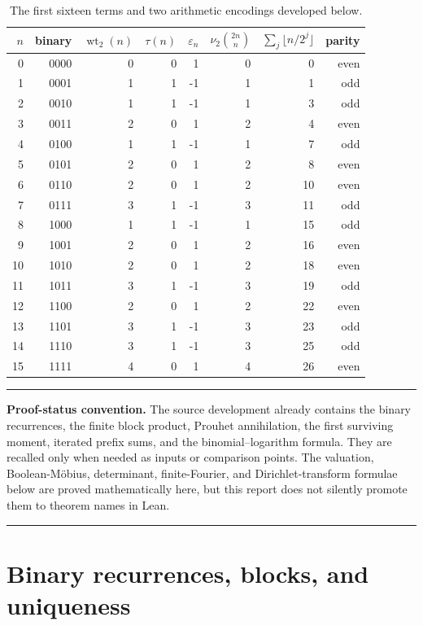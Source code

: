\documentclass[11pt,oneside]{article}
\theoremstyle{definition}
\theoremstyle{remark}
\newcommand{\wt}{\operatorname{wt}_2}
\newcommand{\vtwo}{\nu_2}
\newenvironment{boxedremark}{%
  \par\smallskip\noindent\begin{center}\begin{minipage}{0.94\textwidth}%
  \color{black}\hrule\vspace{0.6em}\small
}{%
  \vspace{0.6em}\hrule\end{minipage}\end{center}\smallskip
}
\begin{document}
\begin{table}[ht]
\centering
\small
\begin{tabular}{@{}rrrrrrrr@{}}
\toprule
$n$ & binary & $\wt(n)$ & $\tau(n)$ & $\varepsilon_n$ &
$\vtwo\binom{2n}{n}$ & $\sum_j\lfloor n/2^j\rfloor$ & parity\\
\midrule
0  & 0000 & 0 & 0 &  1 & 0 &  0 & even\\
1  & 0001 & 1 & 1 & -1 & 1 &  1 & odd\\
2  & 0010 & 1 & 1 & -1 & 1 &  3 & odd\\
3  & 0011 & 2 & 0 &  1 & 2 &  4 & even\\
4  & 0100 & 1 & 1 & -1 & 1 &  7 & odd\\
5  & 0101 & 2 & 0 &  1 & 2 &  8 & even\\
6  & 0110 & 2 & 0 &  1 & 2 & 10 & even\\
7  & 0111 & 3 & 1 & -1 & 3 & 11 & odd\\
8  & 1000 & 1 & 1 & -1 & 1 & 15 & odd\\
9  & 1001 & 2 & 0 &  1 & 2 & 16 & even\\
10 & 1010 & 2 & 0 &  1 & 2 & 18 & even\\
11 & 1011 & 3 & 1 & -1 & 3 & 19 & odd\\
12 & 1100 & 2 & 0 &  1 & 2 & 22 & even\\
13 & 1101 & 3 & 1 & -1 & 3 & 23 & odd\\
14 & 1110 & 3 & 1 & -1 & 3 & 25 & odd\\
15 & 1111 & 4 & 0 &  1 & 4 & 26 & even\\
\bottomrule
\end{tabular}
\caption{The first sixteen terms and two arithmetic encodings developed below.}
\label{tab:first-values}
\end{table}

\begin{boxedremark}
\textbf{Proof-status convention.}
The source development already contains the binary recurrences, the finite
block product, Prouhet annihilation, the first surviving moment, iterated prefix
sums, and the binomial--logarithm formula.  They are recalled only when needed as
inputs or comparison points.  The valuation, Boolean-Möbius, determinant,
finite-Fourier, and Dirichlet-transform formulae below are proved mathematically
here, but this report does not silently promote them to theorem names in Lean.
\end{boxedremark}

\section{Binary recurrences, blocks, and uniqueness}
\label{sec:binary-recursions}
\end{document}
